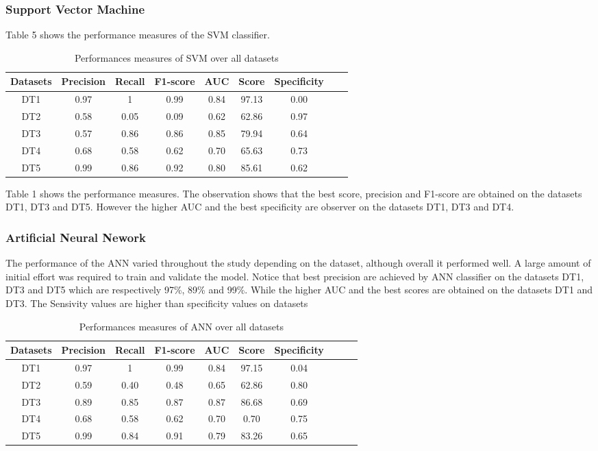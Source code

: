 \subsubsection{Support Vector Machine}

Table 5 shows the performance measures of the SVM classifier.
\begin{table}[!ht]
\centering
\begin{tabular}{*{7}{c}l r}
  \toprule
  \textbf{Datasets} & \textbf{Precision} & \textbf{Recall} & \textbf{F1-score}&\textbf{AUC} &\textbf{Score}&\textbf{Specificity}\\
   \midrule
  DT1 &0.97 &1   &0.99 &0.84 &97.13&0.00 \\
  DT2 &0.58  &0.05   & 0.09&0.62&62.86&0.97\\
  DT3 &0.57 & 0.86&0.86&0.85&79.94&0.64\\
  DT4 & 0.68&0.58&0.62&0.70&65.63&0.73\\
  DT5 &0.99 &0.86&0.92&0.80&85.61&0.62\\
    \bottomrule
\end{tabular}
\caption{Performances measures of SVM over all datasets}\label{perf-measure-dt1}
\end{table}
Table 1 shows the performance measures. The observation shows that the best score, precision and F1-score are obtained on the datasets DT1, DT3 and DT5. However the higher AUC and the best specificity are observer on the datasets DT1, DT3 and DT4.
\subsubsection{Artificial Neural Nework}
The performance of the ANN varied throughout the study depending on the dataset, although overall it performed well. A large amount of initial effort was required to train and validate the model. Notice that best precision are achieved by ANN classifier on the datasets DT1, DT3 and DT5 which are respectively 97\%, 89\% and 99\%. While the higher AUC and the best scores are obtained on the datasets DT1 and DT3. The Sensivity values are higher than specificity values on datasets 
\begin{table}[!ht]
\centering
\begin{tabular}{*{8}{c}l r}
  \toprule
  \textbf{Datasets} & \textbf{Precision} & \textbf{Recall} & \textbf{F1-score}&\textbf{AUC} &\textbf{Score}&\textbf{Specificity}\\
   \midrule
  DT1 &0.97&1 &0.99   &0.84 &97.15&0.04  \\
  DT2 &0.59  &0.40   &0.48&0.65&62.86&0.80 \\
  DT3 &0.89 &0.85 &0.87&0.87&86.68&0.69\\
  DT4 &0.68 &0.58&0.62&0.70&0.70&0.75\\
  DT5 &0.99 &0.84&0.91&0.79&83.26&0.65\\ 
    \bottomrule
\end{tabular}
\caption{Performances measures of ANN over all datasets}\label{perf-measure-dt1}
\end{table}


